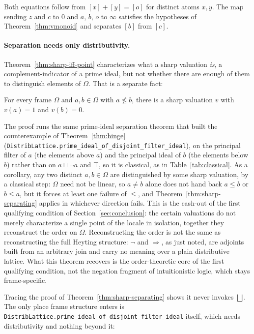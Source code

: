 \noindent
Both equations follow from $[x] + [y] = [o]$ for distinct atoms $x, y$.
The map sending $z$ and $c$ to $0$ and $a$, $b$, $o$ to $\infty$ satisfies
the hypotheses of Theorem~\ref{thm:vmonoid} and separates $[b]$ from
$[c]$.

\paragraph{Separation needs only distributivity.}
Theorem~\ref{thm:sharp-iff-point} characterizes what a sharp
valuation \emph{is}, a complement-indicator of a prime ideal, but
not whether there are enough of them to distinguish elements of
$\Omega$. That is a separate fact:

\begin{theorem}
\label{thm:sharp-separating}
For every frame $\Omega$ and $a, b \in \Omega$ with $a \not\le b$,
there is a sharp valuation $v$ with $v(a) = 1$ and $v(b) = 0$.
\end{theorem}

\noindent
The proof runs the same prime-ideal
separation theorem that built the counterexample of
Theorem~\ref{thm:hinge}
(\texttt{DistribLattice.prime\_ideal\_of\_disjoint\_filter\_ideal}),
on the principal filter of $a$ (the elements above $a$) and the
principal ideal of $b$ (the elements below $b$)
rather than on $a \sqcup \neg a$ and $\top$, so it is classical, as in
Table~\ref{tab:classical}. As a corollary, any two
distinct $a, b \in \Omega$ are distinguished by some sharp
valuation, by a classical step: $\Omega$ need not be linear, so $a \ne b$ alone does not
hand back $a \le b$ or $b \le a$, but it forces at least one failure
of $\le$, and Theorem~\ref{thm:sharp-separating} applies in whichever
direction fails. This is the cash-out of the first qualifying
condition of Section~\ref{sec:conclusion}: the certain valuations do
not merely characterize a single point of the locale in isolation,
together they reconstruct the order on $\Omega$. Reconstructing the
order is not the same as reconstructing the full Heyting structure:
$\neg$ and $\Rightarrow$, as just noted, are adjoints built from an
arbitrary join and carry no meaning over a plain distributive
lattice. What this theorem recovers is the order-theoretic core of
the first qualifying condition, not the negation fragment of
intuitionistic logic, which stays frame-specific.

Tracing the proof of Theorem~\ref{thm:sharp-separating} shows it
never invokes $\bigsqcup$. The only place frame structure enters is
\texttt{DistribLattice.prime\_ideal\_of\_disjoint\_filter\_ideal}
itself, which needs distributivity and nothing beyond it:

